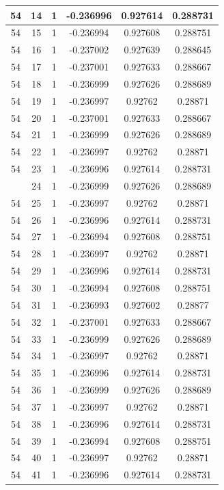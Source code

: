 \documentclass[12pt,a4paper]{article}
\numberwithin{equation}{section}
\numberwithin{figure}{section}
\numberwithin{table}{section}
\begin{document}
\begin{longtable}{|c|c|c|c|c|c|}
54 & 14 & 1 & -0.236996 & 0.927614 & 0.288731 \\ \hline
54 & 15 & 1 & -0.236994 & 0.927608 & 0.288751 \\ \hline
54 & 16 & 1 & -0.237002 & 0.927639 & 0.288645 \\ \hline
54 & 17 & 1 & -0.237001 & 0.927633 & 0.288667 \\ \hline
54 & 18 & 1 & -0.236999 & 0.927626 & 0.288689 \\ \hline
54 & 19 & 1 & -0.236997 & 0.92762 & 0.28871 \\ \hline
54 & 20 & 1 & -0.237001 & 0.927633 & 0.288667 \\ \hline
54 & 21 & 1 & -0.236999 & 0.927626 & 0.288689 \\ \hline
54 & 22 & 1 & -0.236997 & 0.92762 & 0.28871 \\ \hline
54 & 23 & 1 & -0.236996 & 0.927614 & 0.288731 \\ \hline
\pagebreak
54 & 24 & 1 & -0.236999 & 0.927626 & 0.288689 \\ \hline
54 & 25 & 1 & -0.236997 & 0.92762 & 0.28871 \\ \hline
54 & 26 & 1 & -0.236996 & 0.927614 & 0.288731 \\ \hline
54 & 27 & 1 & -0.236994 & 0.927608 & 0.288751 \\ \hline
54 & 28 & 1 & -0.236997 & 0.92762 & 0.28871 \\ \hline
54 & 29 & 1 & -0.236996 & 0.927614 & 0.288731 \\ \hline
54 & 30 & 1 & -0.236994 & 0.927608 & 0.288751 \\ \hline
54 & 31 & 1 & -0.236993 & 0.927602 & 0.28877 \\ \hline
54 & 32 & 1 & -0.237001 & 0.927633 & 0.288667 \\ \hline
54 & 33 & 1 & -0.236999 & 0.927626 & 0.288689 \\ \hline
54 & 34 & 1 & -0.236997 & 0.92762 & 0.28871 \\ \hline
54 & 35 & 1 & -0.236996 & 0.927614 & 0.288731 \\ \hline
54 & 36 & 1 & -0.236999 & 0.927626 & 0.288689 \\ \hline
54 & 37 & 1 & -0.236997 & 0.92762 & 0.28871 \\ \hline
54 & 38 & 1 & -0.236996 & 0.927614 & 0.288731 \\ \hline
54 & 39 & 1 & -0.236994 & 0.927608 & 0.288751 \\ \hline
54 & 40 & 1 & -0.236997 & 0.92762 & 0.28871 \\ \hline
54 & 41 & 1 & -0.236996 & 0.927614 & 0.288731 \\ \hline

\end{longtable}
\end{document}
